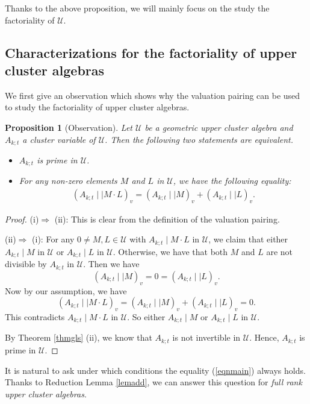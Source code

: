 \documentclass{amsart}
\newtheorem{proposition}[theorem]{Proposition}
\theoremstyle{definition}
\theoremstyle{remark}
\numberwithin{equation}{section}
\begin{document}
Thanks to the above proposition, we will mainly focus on the study the factoriality of $\mathcal U$.

\subsection{Characterizations for the factoriality of upper cluster algebras}\label{sec41}
We first give an observation which shows why the valuation pairing can be used to study the  factoriality of upper cluster algebras.

\begin{proposition}[Observation]\label{observation}
Let $\mathcal U$ be a geometric upper cluster algebra  and $A_{k;t}$ a cluster variable of $\mathcal U$. Then the following two statements are equivalent.
\begin{itemize}
\item[(i)] $A_{k;t}$ is prime in $\mathcal U$.
\item[(ii)] For any non-zero elements $M$ and $L$ in $\mathcal U$, we have the following equality:
\begin{eqnarray}\label{eqnmain}
(A_{k;t}\mid\mid M\cdot L)_v=(A_{k;t}\mid\mid M)_v+(A_{k;t}\mid\mid L)_v.
\end{eqnarray}
\end{itemize}
\end{proposition}
\begin{proof}
(i)$\Rightarrow$ (ii): This is clear from the definition of the valuation pairing.

(ii)$\Rightarrow$ (i):
For any $0\neq M,L\in\mathcal U$ with $A_{k;t}\mid M\cdot L$ in $\mathcal U$, we claim  that either $A_{k;t}\mid  M$ in $\mathcal U$ or $A_{k;t}\mid L$ in $\mathcal U$. Otherwise, we have that
both $M$ and $L$ are not divisible by $A_{k;t}$ in $\mathcal U$. Then we have $$(A_{k;t}\mid\mid M)_v=0=(A_{k;t}\mid\mid L)_v.$$
 Now by our assumption, we have $$(A_{k;t}\mid\mid M\cdot L)_v=(A_{k;t}\mid\mid M)_v+(A_{k;t}\mid\mid L)_v=0.$$
This contradicts $A_{k;t}\mid M\cdot L$ in $\mathcal U$. So either $A_{k;t}\mid  M$ or $A_{k;t}\mid L$ in $\mathcal U$.

By Theorem \ref{thmgls} (ii), we know that $A_{k;t}$ is not invertible in $\mathcal U$. Hence,  $A_{k;t}$ is prime in $\mathcal U$.
\end{proof}

It is natural to ask under which conditions the equality (\ref{eqnmain}) always holds. Thanks to Reduction Lemma \ref{lemadd}, we can answer this question for {\em full rank upper cluster algebras}.
\end{document}
